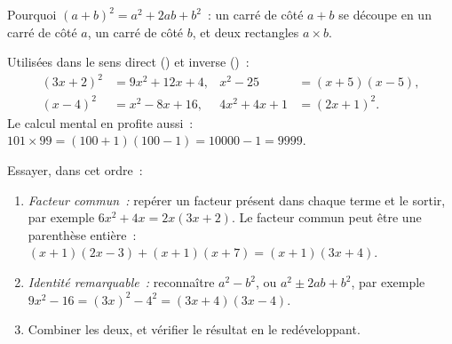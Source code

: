 \begin{omfigure}

{\small Pourquoi $(a+b)^2 = a^2 + 2ab + b^2$~: un carré de côté $a + b$ se
découpe en un carré de côté $a$, un carré de côté $b$, et deux rectangles
$a \times b$.}
\end{omfigure}

\begin{example}\label{ex:g10:algebra:identities}
Utilisées dans le sens direct () et inverse ()~:
\begin{align*}
(3x + 2)^2 &= 9x^2 + 12x + 4,
& x^2 - 25 &= (x+5)(x-5), \\
(x - 4)^2 &= x^2 - 8x + 16,
& 4x^2 + 4x + 1 &= (2x + 1)^2 .
\end{align*}
Le calcul mental en profite aussi~: $101 \times 99 = (100+1)(100-1) =
10000 - 1 = 9999$.
\end{example}

\begin{method}\label{met:g10:algebra:factor}
Essayer, dans cet ordre~:
\begin{enumerate}
  \item \emph{Facteur commun~:} repérer un facteur présent dans chaque
        terme et le sortir, par exemple $6x^2 + 4x = 2x(3x + 2)$. Le
        facteur commun peut être une parenthèse entière~:
        $(x+1)(2x-3) + (x+1)(x+7) = (x+1)(3x+4)$.
  \item \emph{Identité remarquable~:} reconnaître $a^2 - b^2$, ou
        $a^2 \pm 2ab + b^2$, par exemple $9x^2 - 16 = (3x)^2 - 4^2 =
        (3x+4)(3x-4)$.
  \item Combiner les deux, et vérifier le résultat en le redéveloppant.
\end{enumerate}
\end{method}

